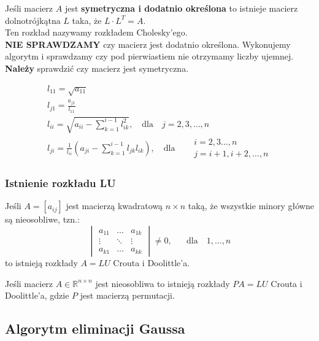\documentclass[../mn-notatki.tex]{subfiles}
\begin{document}
\begin{tcolorbox}
Jeśli macierz $A$ jest \textbf{symetryczna i dodatnio określona} to istnieje
macierz dolnotrójkątna $L$ taka, że $L\cdot L^T = A$.\\
Ten rozkład nazywamy rozkładem Cholesky'ego.\\

\textbf{NIE SPRAWDZAMY} czy macierz jest dodatnio określona. Wykonujemy
algorytm i sprawdzamy czy pod pierwiastiem nie otrzymamy liczby ujemnej.\\
\textbf{Należy} sprawdzić czy macierz jest symetryczna.
\end{tcolorbox}
\begin{gather*}
l_{11} = \sqrt{a_{11}}\\
l_{j1} = \frac{a_{j1}}{l_{11}}\\
l_{ii} = \sqrt{a_{ii} - \sum_{k=1}^{i-1} l_{ik}^2}, \text{~~ dla ~~} j = 2, 3, \ldots, n\\
l_{ji} = \frac{1}{l_{ii}} \left( a_{ji} - \sum_{k=1}^{i-1} l_{jk} l_{ik} \right),
\text{~~ dla ~~}
\begin{aligned}
&i = 2,3 \ldots, n\\
&j = i +1, i+2, \ldots, n
\end{aligned}
\end{gather*}

\subsubsection{Istnienie rozkładu LU}

\begin{tcolorbox}
Jeśli $A = [a_{ij}]$ jest macierzą kwadratową $n\times n$ taką, że wszystkie
minory główne są nieosobliwe, tzn.:
\[
\begin{vmatrix}
a_{11} & \ldots & a_{1k}\\
\vdots & \ddots & \vdots\\
a_{k1} & \ldots & a_{kk}
\end{vmatrix} \neq 0, \text{~~~~~dla~~~} 1,\ldots,n
\]
to istnieją rozkłady $A = LU$ Crouta i Doolittle'a.
\end{tcolorbox}
\begin{tcolorbox}
Jeśli macierz $A \in \mathbb{R}^{n\times n}$ jest nieosobliwa to istnieją
rozkłady $PA = LU$ Crouta i Doolittle'a, gdzie $P$ jest macierzą permutacji.
\end{tcolorbox}

\subsection{Algorytm eliminacji Gaussa}
\end{document}
